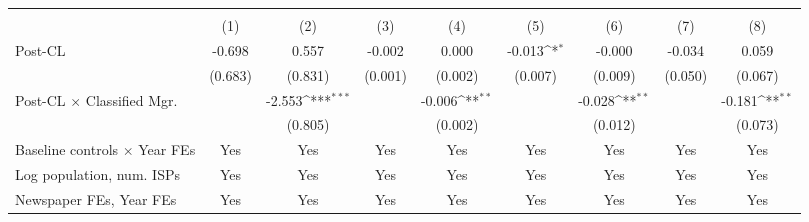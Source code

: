 {
\def\sym#1{\ifmmode^{#1}\else\(^{#1}\)\fi}
\begin{tabular}{l*{8}{c}}
\toprule
                    &&&&\\\cmidrule(lr){2-3}\cmidrule(lr){4-5}\cmidrule(lr){6-7}\cmidrule(lr){8-9}
                    &         &         &         &         &         &         &         &         \\
\midrule
Post-CL             &      -0.698         &       0.557         &      -0.002         &       0.000         &      -0.013\sym{*}  &      -0.000         &      -0.034         &       0.059         \\
                    &     (0.683)         &     (0.831)         &     (0.001)         &     (0.002)         &     (0.007)         &     (0.009)         &     (0.050)         &     (0.067)         \\
\addlinespace
Post-CL $\times$ Classified Mgr.&                     &      -2.553\sym{***}&                     &      -0.006\sym{**} &                     &      -0.028\sym{**} &                     &      -0.181\sym{**} \\
                    &                     &     (0.805)         &                     &     (0.002)         &                     &     (0.012)         &                     &     (0.073)         \\
\addlinespace
Baseline controls $\times$ Year FEs &         Yes         &         Yes         &         Yes         &         Yes         &         Yes         &         Yes         &         Yes         &         Yes         \\
\addlinespace
Log population, num. ISPs &         Yes         &         Yes         &         Yes         &         Yes         &         Yes         &         Yes         &         Yes         &         Yes         \\
\addlinespace
Newspaper FEs, Year FEs &         Yes         &         Yes         &         Yes         &         Yes         &         Yes         &         Yes         &         Yes         &         Yes         \\

\end{tabular}}

